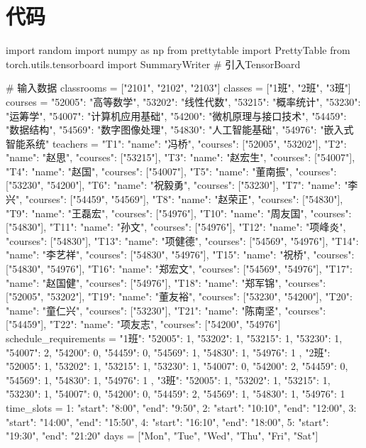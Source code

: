 \documentclass{ctexart}
\begin{document}
	\section{代码}
	\begin{pythoncode}
	import random
	import numpy as np
	from prettytable import PrettyTable
	from torch.utils.tensorboard import SummaryWriter  # 引入TensorBoard
	
	# 输入数据
	classrooms = ["2101", "2102", "2103"]
	classes = ["1班", "2班", "3班"]
	courses = {
	    "52005": "高等数学",
	    "53202": "线性代数",
	    "53215": "概率统计",
	    "53230": "运筹学",
	    "54007": "计算机应用基础",
	    "54200": "微机原理与接口技术",
	    "54459": "数据结构",
	    "54569": "数字图像处理",
	    "54830": "人工智能基础",
	    "54976": "嵌入式智能系统"
	}
	teachers = {
	    "T1": {"name": "冯桥", "courses": ["52005", "53202"]},
	    "T2": {"name": "赵思", "courses": ["53215"]},
	    "T3": {"name": "赵宏生", "courses": ["54007"]},
	    "T4": {"name": "赵国", "courses": ["54007"]},
	    "T5": {"name": "董南振", "courses": ["53230", "54200"]},
	    "T6": {"name": "祝毅勇", "courses": ["53230"]},
	    "T7": {"name": "李兴", "courses": ["54459", "54569"]},
	    "T8": {"name": "赵荣正", "courses": ["54830"]},
	    "T9": {"name": "王磊宏", "courses": ["54976"]},
	    "T10": {"name": "周友国", "courses": ["54830"]},
	    "T11": {"name": "孙文", "courses": ["54976"]},
	    "T12": {"name": "项峰炎", "courses": ["54830"]},
	    "T13": {"name": "项健德", "courses": ["54569", "54976"]},
	    "T14": {"name": "李艺祥", "courses": ["54830", "54976"]},
	    "T15": {"name": "祝桥", "courses": ["54830", "54976"]},
	    "T16": {"name": "郑宏文", "courses": ["54569", "54976"]},
	    "T17": {"name": "赵国健", "courses": ["54976"]},
	    "T18": {"name": "郑军锦", "courses": ["52005", "53202"]},
	    "T19": {"name": "董友裕", "courses": ["53230", "54200"]},
	    "T20": {"name": "童仁兴", "courses": ["53230"]},
	    "T21": {"name": "陈南坚", "courses": ["54459"]},
	    "T22": {"name": "项友志", "courses": ["54200", "54976"]}
	}
	schedule_requirements = {
	    "1班": {
	        "52005": 1,
	        "53202": 1,
	        "53215": 1,
	        "53230": 1,
	        "54007": 2,
	        "54200": 0,
	        "54459": 0,
	        "54569": 1,
	        "54830": 1,
	        "54976": 1
	    },
	    "2班": {
	        "52005": 1,
	        "53202": 1,
	        "53215": 1,
	        "53230": 1,
	        "54007": 0,
	        "54200": 2,
	        "54459": 0,
	        "54569": 1,
	        "54830": 1,
	        "54976": 1
	    },
	    "3班": {
	        "52005": 1,
	        "53202": 1,
	        "53215": 1,
	        "53230": 1,
	        "54007": 0,
	        "54200": 0,
	        "54459": 2,
	        "54569": 1,
	        "54830": 1,
	        "54976": 1
	    }
	}
	time_slots = {
	    1: {"start": "8:00", "end": "9:50"},
	    2: {"start": "10:10", "end": "12:00"},
	    3: {"start": "14:00", "end": "15:50"},
	    4: {"start": "16:10", "end": "18:00"},
	    5: {"start": "19:30", "end": "21:20"}
	}
	days = ["Mon", "Tue", "Wed", "Thu", "Fri", "Sat"]
	

\end{pythoncode}
\end{document}

